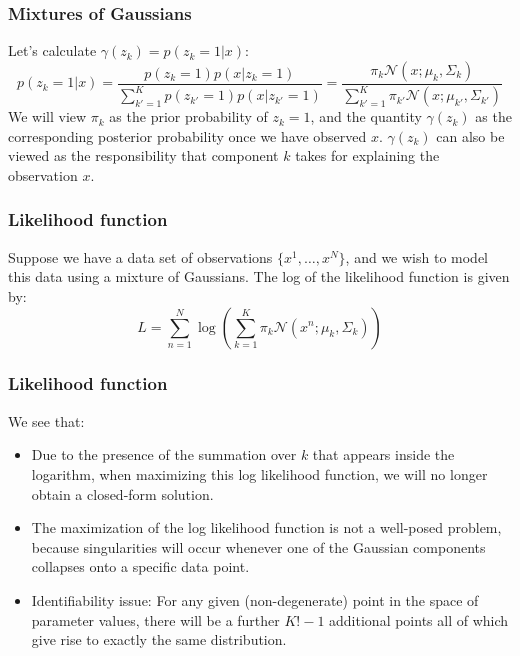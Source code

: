 \documentclass{beamer}
\begin{document}
\begin{frame}
    \frametitle{Mixtures of Gaussians}
    Let's calculate $\gamma(z_{k})=p(z_{k}=1|x)$:
    \begin{equation*}
        p(z_{k}=1|x)=\frac{p(z_{k}=1)p(x|z_{k}=1)}{\sum_{k'=1}^{K}p(z_{k'}=1)p(x|z_{k'}=1)}=\frac{\pi_{k}\mathcal{N}(x;\mu_{k},\Sigma_{k})}{\sum_{k'=1}^{K}\pi_{k'}\mathcal{N}(x;\mu_{k'},\Sigma_{k'})}
    \end{equation*}
    We will view $\pi_{k}$ as the prior probability of $z_{k}=1$, and the quantity $\gamma(z_{k})$ as the corresponding posterior probability once we have observed $x$. $\gamma(z_{k})$ can also be viewed as the responsibility that component $k$ takes for explaining the observation $x$.
\end{frame}

\begin{frame}
    \frametitle{Likelihood function}
    Suppose we have a data set of observations $\{x^{1},\hdots,x^{N}\}$, and we wish to model this data using a mixture of Gaussians. The log of the likelihood function is given by:
    \begin{equation*}
        L=\sum_{n=1}^{N}\log(\sum_{k=1}^{K}\pi_{k}\mathcal{N}(x^{n};\mu_{k},\Sigma_{k}))
    \end{equation*}
\end{frame}

\begin{frame}
    \frametitle{Likelihood function}
    We see that:
    \begin{itemize}
        \item Due to the presence of the summation over $k$ that appears inside the logarithm, when maximizing this log likelihood function, we will no longer obtain a closed-form solution.
        \item The maximization of the log likelihood function is not a well-posed problem, because singularities will occur whenever one of the Gaussian components collapses onto a specific data point.
        \item Identifiability issue: For any given (non-degenerate) point in the space of parameter values, there will be a further $K!-1$ additional points all of which give rise to exactly the same distribution.
    \end{itemize}
\end{frame}
\end{document}
